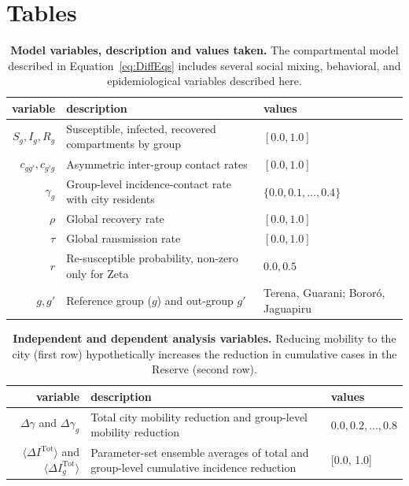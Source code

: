 \documentclass[
  letterpaper,
  abstract]{scrartcl}
\begin{document}
\printbibliography[title=References]


\clearpage

\section{Tables}


\begin{table}[h]
  \centering
  \caption{\textbf{Model variables, description and values taken.} The
  compartmental model described in Equation~\ref{eq:DiffEqs} includes several
social mixing, behavioral, and epidemiological variables described here.}
  \label{tab:ModelVariables}
  \begin{tabular}{rlp{1.3in}} 
    \toprule
    variable & description & values \\ 
    \midrule 
    $S_g,I_g,R_g$ & Susceptible, infected, recovered compartments by group & $[0.0,1.0]$ \\
    $c_{gg'},c_{g'g}$ & Asymmetric inter-group contact rates & $[0.0,1.0]$ \\
    $\gamma_g$ & Group-level incidence-contact rate with city residents &
      $\{0.0,0.1,\ldots,0.4\}$ \\
    $\rho$ & Global recovery rate & $[0.0,1.0]$ \\
    $\tau$ & Global ransmission rate & $[0.0,1.0]$ \\
    $r$    & Re-susceptible probability, non-zero only for Zeta & $0.0,0.5$ \\
    $g,g'$ & Reference group ($g$) and out-group $g'$ & Terena, Guarani; Bororó, Jaguapiru \\
    \bottomrule
  \end{tabular} 
\end{table}



\begin{table}[h]
  \centering
  \caption{\textbf{Independent and dependent analysis variables.} Reducing
  mobility to the city (first row) hypothetically increases the reduction in
cumulative cases in the Reserve (second row).}
  \label{tab:AnalysisVariables}
  \begin{tabular}{rp{3.0in}l} 
    \toprule
    variable & description & values \\
    \midrule 
    $\Delta \gamma$ and $\Delta \gamma_g$ & Total city mobility reduction and 
      group-level mobility reduction & $0.0,0.2,\ldots,0.8$ \\
      $\langle \Delta I^\mathrm{Tot} \rangle$ and $\langle \Delta I^\mathrm{Tot}_g
      \rangle$  & Parameter-set ensemble averages of total and group-level
      cumulative incidence reduction & [0.0, 1.0] \\
    \bottomrule
  \end{tabular} 
\end{table}
\end{document}
